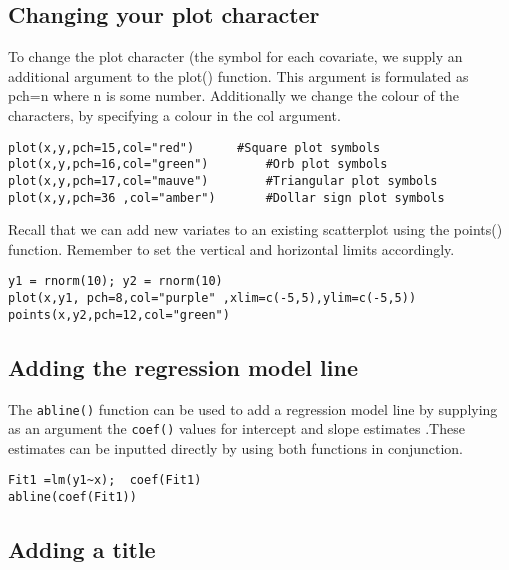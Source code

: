 \subsection{Changing your plot character}

To change the plot character (the symbol for each covariate, we supply an additional argument to the plot() function.  This argument is formulated as pch=n where n is some number.
Additionally we change the colour of the characters, by specifying a colour in the col argument.
\footnotesize \begin{verbatim}
plot(x,y,pch=15,col="red")		#Square plot symbols
plot(x,y,pch=16,col="green")		#Orb plot symbols
plot(x,y,pch=17,col="mauve")		#Triangular plot symbols
plot(x,y,pch=36	,col="amber")		#Dollar sign plot symbols
\end{verbatim}\normalsize
Recall that we can add new variates to an existing scatterplot using the points() function. Remember to set the vertical and horizontal limits accordingly.
\footnotesize \begin{verbatim}
y1 = rnorm(10); y2 = rnorm(10)
plot(x,y1, pch=8,col="purple" ,xlim=c(-5,5),ylim=c(-5,5))
points(x,y2,pch=12,col="green")
\end{verbatim}\normalsize
\subsection{Adding the regression model line}

The \texttt{abline()} function can be used to add a regression model line  by supplying as an argument the \texttt{coef()} values for intercept and slope estimates .These estimates can be inputted directly by using both functions in conjunction.

\footnotesize \begin{verbatim}
Fit1 =lm(y1~x);  coef(Fit1)
abline(coef(Fit1))	
\end{verbatim}\normalsize

\subsection{Adding a title }

